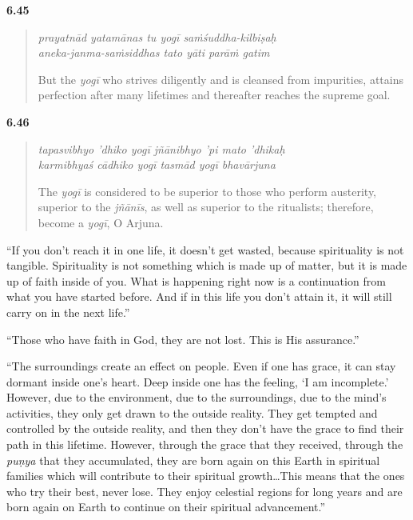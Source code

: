 \par\noindent\textbf{6.45}\par
\begin{verse}
\textit{prayatnād yatamānas tu yogī saṁśuddha-kilbiṣaḥ} \\
\textit{aneka-janma-saṁsiddhas tato yāti parāṁ gatim}

\noindent But the \textit{yogī} who strives diligently and is cleansed from impurities, attains perfection after many lifetimes and thereafter reaches the supreme goal.
\end{verse}
\par



\par\noindent\textbf{6.46}\par
\begin{verse}
\textit{tapasvibhyo ’dhiko yogī jñānibhyo ’pi mato ’dhikaḥ} \\
\textit{karmibhyaś cādhiko yogī tasmād yogī bhavārjuna}

\noindent The \textit{yogī} is considered to be superior to those who perform austerity, superior to the \textit{jñānīs}, as well as superior to the ritualists; therefore, become a \textit{yogī}, O Arjuna.
\end{verse}
\par


\enquote{If you don’t reach it in one life, it doesn’t get wasted, because spirituality is not tangible. Spirituality is not something which is made up of matter, but it is made up of faith inside of you. What is happening right now is a continuation from what you have started before. And if in this life you don’t attain it, it will still carry on in the next life.}

\enquote{Those who have faith in God, they are not lost. This is His assurance.}

\enquote{The surroundings create an effect on people. Even if one has grace, it can stay dormant inside one’s heart. Deep inside one has the feeling, \enquote{I am incomplete.} However, due to the environment, due to the surroundings, due to the mind’s activities, they only get drawn to the outside reality. They get tempted and controlled by the outside reality, and then they don’t have the grace to find their path in this lifetime. However, through the grace that they received, through the \textit{puṇya} that they accumulated, they are born again on this Earth in spiritual families which will contribute to their spiritual growth\ldots This means that the ones who try their best, never lose. They enjoy celestial regions for long years and are born again on Earth to continue on their spiritual advancement.}


